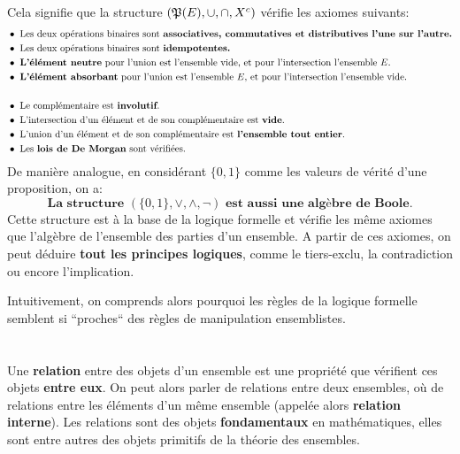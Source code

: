 Cela signifie que la structure \((\mathbf{\mathfrak{P}}(E), \cup, \cap, X^c)\) vérifie les axiomes suivants:
\begin{align*}
    &\bullet \text{ Les deux opérations binaires sont \textbf{associatives, commutatives et distributives l'une sur l'autre.}}\\
    &\bullet \text{ Les deux opérations binaires sont \textbf{idempotentes.}}\\
    &\bullet \text{ \textbf{L'élément neutre} pour l'union est l'ensemble vide, et pour l'intersection l'ensemble \(E\).}\\
    &\bullet \text{ \textbf{L'élément absorbant} pour l'union est l'ensemble \(E\), et pour l'intersection l'ensemble vide.}\\
    &\\
    &\bullet \text{ Le complémentaire est \textbf{involutif}.}\\
    &\bullet \text{ L'intersection d'un élément et de son complémentaire est \textbf{vide}.}\\
    &\bullet \text{ L'union d'un élément et de son complémentaire est \textbf{l'ensemble tout entier}.}\\
    &\bullet \text{ Les \textbf{lois de De Morgan} sont vérifiées.}\\
\end{align*}
De manière analogue, en considérant \(\{0, 1\}\) comme les valeurs de vérité d'une proposition, on a:
\[
    \boxed{
        \textbf{La structure } (\{0, 1\}, \lor, \land, \lnot) \textbf{ est aussi une algèbre de Boole.}
    }
\]
Cette structure est à la base de la logique formelle et vérifie les même axiomes que l'algèbre de l'ensemble des parties d'un ensemble.\+
A partir de ces axiomes, on peut déduire \textbf{tout les principes logiques}, comme le tiers-exclu, la contradiction ou encore l'implication.\<

Intuitivement, on comprends alors pourquoi les règles de la logique formelle semblent si ``proches`` des règles de manipulation ensemblistes. 


\chapter*{}
Une \textbf{relation} entre des objets d'un ensemble est une propriété que vérifient ces objets \textbf{entre eux}.\+
On peut alors parler de relations entre deux ensembles, où de relations entre les éléments d'un même ensemble (appelée alors \textbf{relation interne}).\+
Les relations sont des objets \textbf{fondamentaux} en mathématiques, elles sont entre autres des objets primitifs de la théorie des ensembles.\<


